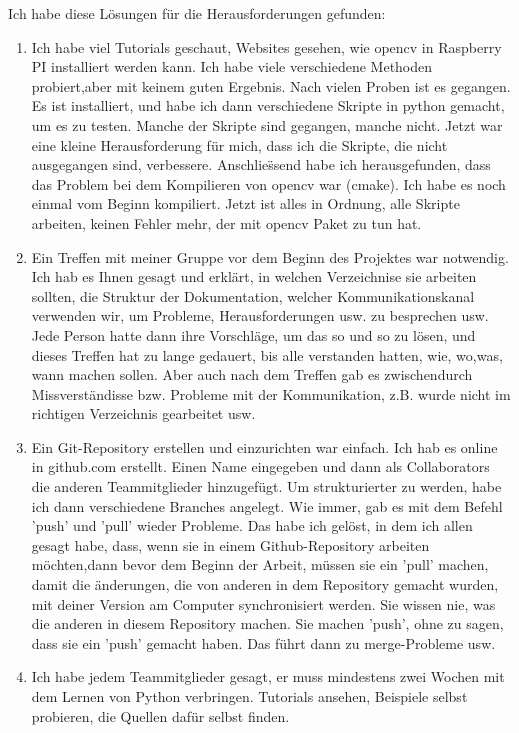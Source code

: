 \begin{itemize}
Ich habe diese L\"osungen f\"ur die Herausforderungen gefunden: 
\begin{enumerate}
	\item Ich habe viel Tutorials geschaut, Websites gesehen, wie opencv in Raspberry PI installiert werden kann. Ich habe viele verschiedene Methoden probiert,aber mit keinem guten Ergebnis. Nach vielen Proben ist es gegangen. Es ist installiert, und habe ich dann verschiedene Skripte in python gemacht, um es zu testen. Manche der Skripte sind gegangen, manche nicht. Jetzt war eine kleine Herausforderung f\"ur mich, dass ich die Skripte, die nicht ausgegangen sind, verbessere. Anschlie\"ssend habe ich herausgefunden, dass das Problem bei dem Kompilieren von opencv war (cmake). Ich habe es noch einmal vom Beginn kompiliert. Jetzt ist alles in Ordnung, alle Skripte arbeiten, keinen Fehler mehr, der mit opencv Paket zu tun hat.
	
	\item Ein Treffen mit meiner Gruppe vor dem Beginn des Projektes war notwendig. Ich hab es Ihnen gesagt und erkl\"art, in welchen Verzeichnise sie arbeiten sollten, die Struktur der Dokumentation, welcher Kommunikationskanal verwenden wir, um Probleme, Herausforderungen usw. zu besprechen usw. Jede Person hatte dann ihre Vorschl\"age, um das so und so zu l\"osen, und dieses Treffen hat zu lange gedauert, bis alle verstanden hatten, wie, wo,was, wann machen sollen. Aber auch nach dem Treffen gab es zwischendurch Missverst\"andisse bzw. Probleme mit der Kommunikation, z.B. wurde nicht im richtigen Verzeichnis gearbeitet usw. 
	
	\item Ein Git-Repository erstellen und einzurichten war einfach. Ich hab es online in github.com erstellt. Einen Name eingegeben und dann als Collaborators die anderen Teammitglieder hinzugef\"ugt. Um strukturierter zu werden, habe ich dann verschiedene Branches angelegt. Wie immer, gab es mit dem Befehl 'push' und 'pull' wieder Probleme. Das habe ich gel\"ost, in dem ich allen gesagt habe, dass, wenn sie in einem Github-Repository arbeiten m\"ochten,dann bevor dem Beginn der Arbeit, m\"ussen sie ein 'pull' machen, damit die \"anderungen, die von anderen in dem Repository gemacht wurden, mit deiner Version am Computer synchronisiert werden. Sie wissen nie, was die anderen in diesem Repository machen. Sie machen 'push', ohne zu sagen, dass sie ein 'push' gemacht haben. Das f\"uhrt dann zu merge-Probleme usw. 
	
	\item Ich habe jedem Teammitglieder gesagt, er muss mindestens zwei Wochen mit dem Lernen von Python verbringen. Tutorials ansehen, Beispiele selbst probieren, die Quellen daf\"ur selbst finden. 
	

\end{enumerate}
\end{itemize}
